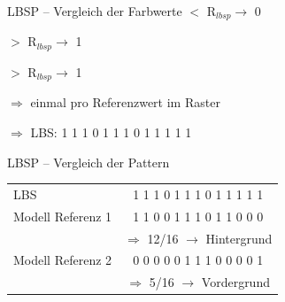 \documentclass[hyperref={pdfpagelabels=false}]{beamer}
\begin{document}
\begin{frame}[t]{LBSP -- Vergleich der Farbwerte}
	\centering
	\bigskip
	\bigskip
	 $<$ R$_{lbsp} \rightarrow$ 0

	 $>$ R$_{lbsp} \rightarrow$ 1
	
	 $>$ R$_{lbsp} \rightarrow$ 1

	\bigskip
	\bigskip
	$\Rightarrow$ einmal pro Referenzwert im Raster
	\bigskip
	
	$\Rightarrow$ LBS: 1 1 1 0 1 1 1 0 1 1 1 1 1

\end{frame}


\begin{frame}[t]{LBSP -- Vergleich der Pattern}
	\centering
	\begin{table}
		\centering
		\label{tab:label}
		\renewcommand{\arraystretch}{2}
		\begin{tabular}{lc}
			LBS& 	1 1 1 0\quad 1 1 1 1\quad 0 0 1 1\quad 1 1 1 1\\
			Modell Referenz 1& 	1 1 0 0\quad 1 1 1 1\quad 0 0 1 1\quad 1 0 0 0\\
			& 		$\Rightarrow$ 12/16 $\rightarrow$ Hintergrund\\
			Modell Referenz 2& 	0 0 0 0\quad 1 0 1 1\quad 0 1 0 0\quad 0 0 0 1\\
			& 		$\Rightarrow$ 5/16 $\rightarrow$ Vordergrund\\
		\end{tabular}
	\end{table}
\end{frame}
\end{document}

